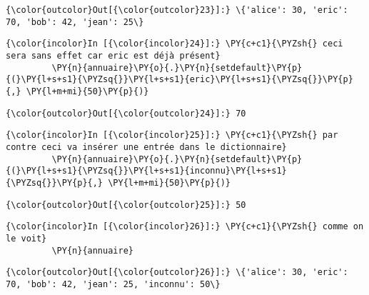 \begin{Verbatim}[commandchars=\\\{\},frame=single,framerule=0.3mm,rulecolor=\color{cellframecolor}]
{\color{outcolor}Out[{\color{outcolor}23}]:} \{'alice': 30, 'eric': 70, 'bob': 42, 'jean': 25\}
\end{Verbatim}
            
    \begin{Verbatim}[commandchars=\\\{\},frame=single,framerule=0.3mm,rulecolor=\color{cellframecolor}]
{\color{incolor}In [{\color{incolor}24}]:} \PY{c+c1}{\PYZsh{} ceci sera sans effet car eric est déjà présent}
         \PY{n}{annuaire}\PY{o}{.}\PY{n}{setdefault}\PY{p}{(}\PY{l+s+s1}{\PYZsq{}}\PY{l+s+s1}{eric}\PY{l+s+s1}{\PYZsq{}}\PY{p}{,} \PY{l+m+mi}{50}\PY{p}{)}
\end{Verbatim}


\begin{Verbatim}[commandchars=\\\{\},frame=single,framerule=0.3mm,rulecolor=\color{cellframecolor}]
{\color{outcolor}Out[{\color{outcolor}24}]:} 70
\end{Verbatim}
            
    \begin{Verbatim}[commandchars=\\\{\},frame=single,framerule=0.3mm,rulecolor=\color{cellframecolor}]
{\color{incolor}In [{\color{incolor}25}]:} \PY{c+c1}{\PYZsh{} par contre ceci va insérer une entrée dans le dictionnaire}
         \PY{n}{annuaire}\PY{o}{.}\PY{n}{setdefault}\PY{p}{(}\PY{l+s+s1}{\PYZsq{}}\PY{l+s+s1}{inconnu}\PY{l+s+s1}{\PYZsq{}}\PY{p}{,} \PY{l+m+mi}{50}\PY{p}{)}
\end{Verbatim}


\begin{Verbatim}[commandchars=\\\{\},frame=single,framerule=0.3mm,rulecolor=\color{cellframecolor}]
{\color{outcolor}Out[{\color{outcolor}25}]:} 50
\end{Verbatim}
            
    \begin{Verbatim}[commandchars=\\\{\},frame=single,framerule=0.3mm,rulecolor=\color{cellframecolor}]
{\color{incolor}In [{\color{incolor}26}]:} \PY{c+c1}{\PYZsh{} comme on le voit}
         \PY{n}{annuaire}
\end{Verbatim}


\begin{Verbatim}[commandchars=\\\{\},frame=single,framerule=0.3mm,rulecolor=\color{cellframecolor}]
{\color{outcolor}Out[{\color{outcolor}26}]:} \{'alice': 30, 'eric': 70, 'bob': 42, 'jean': 25, 'inconnu': 50\}
\end{Verbatim}
            
